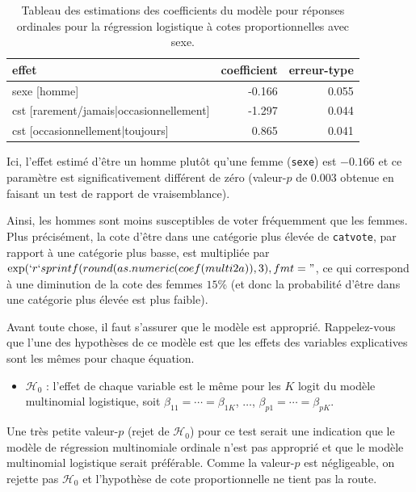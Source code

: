 \documentclass[
  11pt,
  letterpaper,
]{book}
\providecommand{\tightlist}{%
  \setlength{\itemsep}{0pt}\setlength{\parskip}{0pt}}\usepackage{longtable,booktabs,array}
\theoremstyle{definition}
\theoremstyle{remark}
\begin{document}
\hypertarget{tbl-ordered-logistic}{}
\begin{table}
\caption{\label{tbl-ordered-logistic}Tableau des estimations des coefficients du modèle pour réponses
ordinales pour la régression logistique à cotes proportionnelles avec
sexe. }\tabularnewline

\centering
\begin{tabular}[t]{lrr}
\toprule
effet & coefficient & erreur-type\\
\midrule
sexe [homme] & -0.166 & 0.055\\
cst [rarement/jamais|occasionnellement] & -1.297 & 0.044\\
cst [occasionnellement|toujours] & 0.865 & 0.041\\
\bottomrule
\end{tabular}
\end{table}

Ici, l'effet estimé d'être un homme plutôt qu'une femme (\texttt{sexe})
est \(-0.166\) et ce paramètre est significativement différent de zéro
(valeur-\(p\) de \(0.003\) obtenue en faisant un test de rapport de
vraisemblance).

Ainsi, les hommes sont moins susceptibles de voter fréquemment que les
femmes. Plus précisément, la cote d'être dans une catégorie plus élevée
de \texttt{catvote}, par rapport à une catégorie plus basse, est
multipliée par
\(\exp(`r `sprintf(round(as.numeric(coef(multi2a)),3), fmt = "%
\), ce qui correspond à une diminution de la cote des femmes \(15\)\%
(et donc la probabilité d'être dans une catégorie plus élevée est plus
faible).

Avant toute chose, il faut s'assurer que le modèle est approprié.
Rappelez-vous que l'une des hypothèses de ce modèle est que les effets
des variables explicatives sont les mêmes pour chaque équation.

\begin{itemize}
\tightlist
\item
  \(\mathscr{H}_0\) : l'effet de chaque variable est le même pour les
  \(K\) logit du modèle multinomial logistique, soit
  \(\beta_{11} = \cdots =\beta_{1K}\), \(\ldots\),
  \(\beta_{p1} = \cdots =\beta_{pK}\).
\end{itemize}

Une très petite valeur-\(p\) (rejet de \(\mathscr{H}_0\)) pour ce test
serait une indication que le modèle de régression multinomiale ordinale
n'est pas approprié et que le modèle multinomial logistique serait
préférable. Comme la valeur-\(p\) est négligeable, on rejette pas
\(\mathscr{H}_0\) et l'hypothèse de cote proportionnelle ne tient pas la
route.
\end{document}
